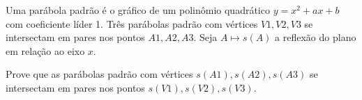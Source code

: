 Uma parábola padrão é o gráfico de um polinômio quadrático \(y = x^2 + ax + b\) com coeficiente líder 1. Três parábolas padrão com vértices \(V1, V2, V3\) se intersectam em pares nos pontos \(A1, A2, A3\). Seja \(A \mapsto s(A)\) a reflexão do plano em relação ao eixo \(x\).

Prove que as parábolas padrão com vértices \(s (A1), s (A2), s (A3)\) se intersectam em pares nos pontos \(s (V1), s (V2), s (V3)\).
